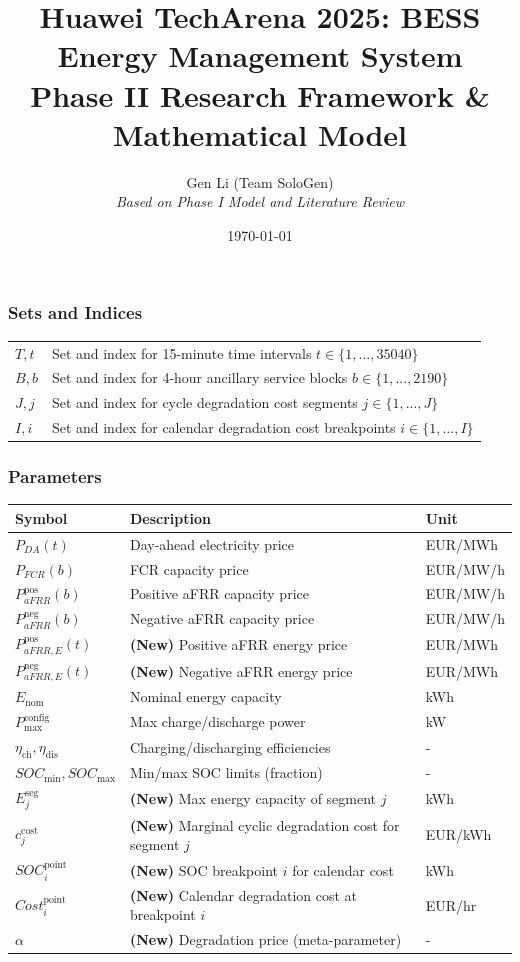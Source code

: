 \documentclass[11pt, a4paper]{article}
\title{Huawei TechArena 2025: BESS Energy Management System \\ \large Phase II Research Framework \& Mathematical Model}
\author{Gen Li (Team SoloGen) \\ \small \textit{Based on Phase I Model and Literature Review}}
\date{\today} %
\begin{document}
\subsubsection*{Sets and Indices}
\begin{tabular}{@{}ll}
\toprule
$T, t$ & Set and index for 15-minute time intervals $t \in \{1, ..., 35040\}$ \\
$B, b$ & Set and index for 4-hour ancillary service blocks $b \in \{1, ..., 2190\}$ \\
$J, j$ & Set and index for cycle degradation cost segments $j \in \{1, ..., J\}$ \\
$I, i$ & Set and index for calendar degradation cost breakpoints $i \in \{1, ..., I\}$ \\
\bottomrule
\end{tabular}

\subsubsection{Parameters}
\begin{tabular}{@{}lll}
\toprule
Symbol & Description & Unit \\
\midrule
$P_{DA}(t)$ & Day-ahead electricity price & EUR/MWh \\
$P_{FCR}(b)$ & FCR capacity price & EUR/MW/h \\
$P^{\mathrm{pos}}_{aFRR}(b)$ & Positive aFRR capacity price & EUR/MW/h \\
$P^{\mathrm{neg}}_{aFRR}(b)$ & Negative aFRR capacity price & EUR/MW/h \\
$P^{\mathrm{pos}}_{aFRR,E}(t)$ & \textbf{(New)} Positive aFRR energy price & EUR/MWh \\
$P^{\mathrm{neg}}_{aFRR,E}(t)$ & \textbf{(New)} Negative aFRR energy price & EUR/MWh \\
$E_{\mathrm{nom}}$ & Nominal energy capacity & kWh \\
$P^{\mathrm{config}}_{\max}$ & Max charge/discharge power & kW \\
$\eta_{\mathrm{ch}}, \eta_{\mathrm{dis}}$ & Charging/discharging efficiencies & - \\
$SOC_{\min}, SOC_{\max}$ & Min/max SOC limits (fraction) & - \\
$E^{\mathrm{seg}}_{j}$ & \textbf{(New)} Max energy capacity of segment $j$ & kWh \\
$c^{\mathrm{cost}}_{j}$ & \textbf{(New)} Marginal cyclic degradation cost for segment $j$ & EUR/kWh \\
$SOC^{\mathrm{point}}_i$ & \textbf{(New)} SOC breakpoint $i$ for calendar cost & kWh \\
$Cost^{\mathrm{point}}_i$ & \textbf{(New)} Calendar degradation cost at breakpoint $i$ & EUR/hr \\
$\alpha$ & \textbf{(New)} Degradation price (meta-parameter) & - \\
\bottomrule
\end{tabular}
\end{document}
